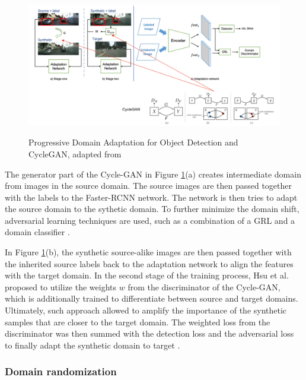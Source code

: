 \documentclass[english, 12pt, a4paper, elec, utf8, a-1b, online]{aaltothesis}
\begin{document}
\begin{figure}[htb]
	\begin{center}
		\includegraphics[width=16cm]{./GAN.png}
	\end{center}
	\caption{Progressive Domain Adaptation for Object Detection and CycleGAN, adapted from \cite{Hsu2019}}
	\begin{center}
		\label{gan}
	\end{center}
\end{figure}
\FloatBarrier

The generator part of the Cycle-GAN in Figure \ref{gan}(a) creates intermediate domain from images in the source domain. The source images are then passed together with the labels to the Faster-RCNN network. The network is then tries to adapt the source domain to the sythetic domain. To further minimize the domain shift, adversarial learning techniques are used, such as a combination of a GRL and a domain classifier \cite{Hsu2019}.


In Figure \ref{gan}(b), the synthetic source-alike images are then passed together with the inherited source labels back to the adaptation network to align the features with the target domain. In the second stage of the training process, Hsu et al. proposed to utilize the weights $w$ from the discriminator of the Cycle-GAN, which is additionally trained to differentiate between source and target domains. Ultimately, such approach allowed to amplify the importance of the synthetic samples that are closer to the target domain. The weighted loss from the discriminator was then summed with the detection loss and the adversarial loss to finally adapt the synthetic domain to target \cite{Hsu2019}. 

\subsubsection{Domain randomization}
\end{document}
